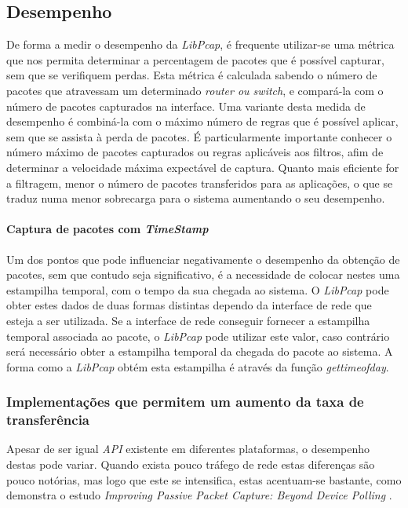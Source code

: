 \subsection{Desempenho}
De forma a medir o desempenho da \textit{LibPcap}, é frequente utilizar-se uma métrica que nos permita determinar a percentagem de pacotes que é possível capturar, sem que se verifiquem perdas.
Esta métrica é calculada sabendo o número de pacotes que atravessam um determinado \textit{router ou switch}, e compará-la com o número de pacotes capturados na interface.
Uma variante desta medida de desempenho é combiná-la com o máximo número de regras que é possível aplicar, sem que se assista à perda de pacotes.
É particularmente importante conhecer o número máximo de pacotes capturados ou regras aplicáveis aos filtros, afim de determinar a velocidade máxima expectável de captura.
Quanto mais eficiente for a filtragem, menor o número de pacotes transferidos para as aplicações, o que se traduz numa menor sobrecarga para o sistema aumentando o seu desempenho.

\paragraph{Captura de pacotes com \textit{TimeStamp}}
Um dos pontos que pode influenciar negativamente o desempenho da obtenção de pacotes, sem que contudo seja significativo, é a necessidade de colocar nestes uma estampilha temporal, com o tempo da sua chegada ao sistema.
O \textit{LibPcap} pode obter estes dados de duas formas distintas dependo da interface de rede que esteja a ser utilizada.
Se a interface de rede conseguir fornecer a estampilha temporal associada ao pacote, o \textit{LibPcap} pode utilizar este valor, caso contrário será necessário obter a estampilha temporal da chegada do pacote ao sistema.
A forma como a \textit{LibPcap} obtém esta estampilha é através da função \textit{gettimeofday}.

\subsubsection{Implementações que permitem um aumento da taxa de transferência}

Apesar de ser igual \textit{API} existente em diferentes plataformas, o desempenho destas pode variar.
Quando exista pouco tráfego de rede estas diferenças são pouco notórias, mas logo que este se intensifica, estas acentuam-se bastante, como demonstra o estudo \textit{Improving Passive Packet Capture: Beyond Device Polling} \cite{Deri2004}.

